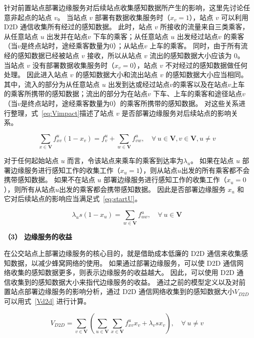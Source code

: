 针对前置站点部署边缘服务对后续站点收集感知数据所产生的影响，这里先讨论任意非起点的站点 $v$。
当站点 $v$ 部署有数据收集服务时（$x_v = 1$），站点 $v$ 可以利用 D2D 通信收集所有经过的感知数据。
此时，站点 $v$ 所接收的流量来自三类乘客，从任意站点 $u$ 出发并在站点$v$ 下车的乘客；从任意站点 $u$ 出发经过站点$v$ 的乘客（当$v$是终点站时，途经乘客数量为0）；从站点$v$ 上车的乘客。
同时，由于所有流经的感知数据已经被站点 $v$ 接收，所以从站点 $v$ 流出的感知数据大小应该为 0。
当站点 $v$ 没有部署数据收集服务时（$x_v = 0$），站点 $v$ 不对经过的感知数据做任何处理。
因此进入站点 $v$ 的感知数据大小和流出站点 $v$ 的感知数据大小应当相同。
其中，流入的部分为从任意站点 $u$ 出发到达或经过站点$v$的乘客以及在站点$v$上车的乘客所携带的感知数据；流出的部分为在站点$v$ 下车、上车的乘客和途径站点$v$ （当$v$是终点站时，途经乘客数量为0）的乘客所携带的感知数据。
对这些关系进行整理，式~\eqref{eq:Vimpact}描述了站点 $v$ 是否部署边缘服务对后续站点的影响关系。

\begin{equation}
  \label{eq:Vimpact}
    \sum_{x\in \boldsymbol{V}}f^u_{xv} (1-x_v) = f^u_v + \sum_{w\in \boldsymbol{V}}f^u_{vw}, \quad \forall \ u\in \boldsymbol{V}, v\in \boldsymbol{V}, u \neq v
\end{equation}

对于任何起始站点 $u$ 而言，令该站点来乘车的乘客到达率为$\lambda_u$。
如果在站点 $u$ 部署边缘服务进行感知工作的收集工作（$x_u = 1$），则从站点$u$出发的所有乘客都不会携带感知数据。
如果不在站点 $u$ 部署边缘服务进行感知工作的收集工作（$x_u = 0$），则所有从站点$u$出发的乘客都会携带感知数据。
因此是否部署边缘服务 $x_u$ 和它对后续站点的影响应当满足式~\eqref{eq:startU}。

\begin{equation}
\label{eq:startU}
\lambda_u s (1 - x_u) = \sum_{w\in \boldsymbol{V}}f^u_{uw}, \quad \forall \  u\in \boldsymbol{V}
\end{equation}

\textbf{（3） 边缘服务的收益}

在公交站点上部署边缘服务的核心目的，就是借助成本低廉的 D2D 通信来收集感知数据，以减少蜂窝网络的使用。
如果通过部署边缘服务，可以使 D2D 通信网络收集的感知数据更多，则表示边缘服务的收益越大。
因此，可以使用 D2D 通信收集到的感知数据大小来指代边缘服务的收益。
通过之前的模型定义以及对前置站点部署边缘服务的影响分析，通过 D2D 通信网络收集到的感知数据大小$V_{D2D}$可以用式~\eqref{Vd2d} 进行计算。

\begin{equation}
\label{Vd2d}
V_{D2D} = \sum_{v\in \boldsymbol{V}}(\sum_{u\in \boldsymbol{V}}\sum_{x\in \boldsymbol{V}}f^u_{xv} x_v + \lambda_v s x_v), \quad \forall \  u \neq v
\end{equation}

